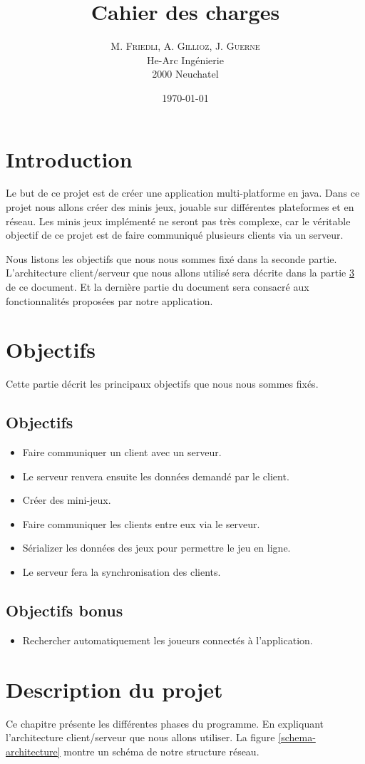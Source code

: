 \documentclass{report}
\title{Cahier des charges}
\author{M. \textsc{Friedli}, A. \textsc{Gillioz}, J. \textsc{Guerne}\\
He-Arc Ingénierie\\
2000 Neuchatel}
\date{\today{}}
\begin{document}
\maketitle{}
\chapter{Introduction}
Le but de ce projet est de créer une application multi-platforme en java. Dans ce projet nous allons créer des minis jeux, jouable sur différentes plateformes et en réseau. Les minis jeux implémenté
ne seront pas très complexe, car le véritable objectif de ce projet est de faire communiqué plusieurs clients via un serveur.\par
Nous listons les objectifs que nous nous sommes fixé dans la seconde partie. L'architecture client/serveur que nous allons utilisé sera décrite dans la partie \ref{desciption-projet} de ce document.
Et la dernière partie du document sera consacré aux fonctionnalités proposées par notre application.
\chapter{Objectifs}
Cette partie décrit les principaux objectifs que nous nous sommes fixés.
\section{Objectifs}\label{objectifs}
\begin{itemize}
	\item Faire communiquer un client avec un serveur.
	\item Le serveur renvera ensuite les données demandé par le client.
	\item Créer des mini-jeux.
	\item Faire communiquer les clients entre eux via le serveur.
	\item Sérializer les données des jeux pour permettre le jeu en ligne.
	\item Le serveur fera la synchronisation des clients.
\end{itemize}
\section{Objectifs bonus}\label{objectifs-bonus}
\begin{itemize}
	\item Rechercher automatiquement les joueurs connectés à l'application.
\end{itemize}
\chapter{Description du projet}\label{desciption-projet}
Ce chapitre présente les différentes phases du programme. En expliquant l'architecture client/serveur que nous allons utiliser. La figure \ref{schema-architecture} montre un schéma de notre
structure réseau.
\end{document}
